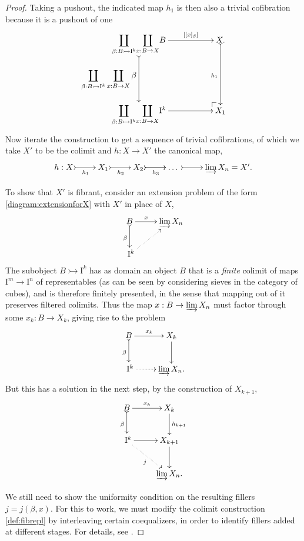 \documentclass[11pt]{article}
\makeatletter
\newcommand{\pocorner}[1][dr]{\save*!/#1+1.2pc/#1:(1,-1)@^{|-}\restore}
\newcommand{\mono}{\ensuremath{\rightarrowtail}}
\newcommand{\ra}{\ensuremath{\rightarrow}}
\newcommand{\I}{\ensuremath{\mathrm{I}}}
\theoremstyle{remark}
\theoremstyle{definition}
\makeatother
\begin{document}
\begin{proof}
Taking a pushout, the indicated map $h_1$ is then also a trivial cofibration because it is a pushout of one
\begin{equation*}%
\xymatrix{
{\displaystyle\coprod_{\beta: B\mono\I^k}} {{\displaystyle\coprod_{x: B\ra X}} B} {\ar@{>->}[dd]_-{{\displaystyle\coprod_{\beta: B\mono\I^k}} \displaystyle\coprod_{x: B\ra X}\beta}} {\ar[rr]^-{[[x]_\beta]}} && X \ar@{>->}[dd]_{h_1}.\\
&&\\
{\displaystyle\coprod_{\beta: B\mono\I^k}} {{\displaystyle\coprod_{x: B\ra X}} \I^{k}}{\ar[rr]} && {\pocorner} X_1
}
\end{equation*}
Now iterate the construction to get a sequence of trivial cofibrations, of which we take $X'$ to be the colimit and $h :X\to X'$ the canonical map,
\begin{equation}\label{def:fibrepl}
\xymatrix{
h:X \ar@{>->}[r]_-{h_1} & X_1 \ar@{>->}[r]_-{h_2} & X_2 \ar@{>->}[r]_-{h_3} \ar@{>->}[r] & \dots\ \ar@{>->}[r] & {\varinjlim X_n} = X'.
}
\end{equation}

To show that $X'$ is fibrant, consider an extension problem of the form \eqref{diagram:extensionforX} with $X'$ in place of $X$,
\begin{equation*}%
\xymatrix{
B \ar@{>->}[d]_{\beta} \ar[r]^-x & {\varinjlim X_n}\\
\ \I^{k} \ar@{..>}[ru]&
}
\end{equation*}
The subobject $B\mono \I^k$ has as domain an object $B$ that is a \emph{finite} colimit of maps $\I^m \ra \I^n$ of representables (as can be seen by considering sieves in the category of cubes), and is therefore finitely presented, in the sense that mapping out of it preserves filtered colimits.  Thus the map $x: B \to {\varinjlim X_n}$ must factor through some $x_k: B \to X_k$, giving rise to the problem
\begin{equation*}%
\xymatrix{
B \ar@{>->}[d]_{\beta} \ar[r]^-{x_k}  & X_k \ar[d] \\
\ \I^{k} \ar@{..>}[r] &  {\varinjlim X_n}.
}
\end{equation*}
But this has a solution in the next step, by the construction of $X_{k+1}$,
\begin{equation*}%
\xymatrix{
B \ar@{>->}[d]_{\beta} \ar[r]^-{x_k} & X_k \ar[d]^{h_{k+1}} \\
\ \I^{k} \ar[r]  \ar@{..>}[rd]_j &  X_{k+1}\ar[d]\\
& {\varinjlim X_n}.
}
\end{equation*}

We still need to show the uniformity condition on the resulting fillers $j = j(\beta,x)$.  For this to work, we must modify the colimit construction \eqref{def:fibrepl} by interleaving certain coequalizers, in order to identify fillers added at different stages.  For details, see \cite{Garner, Awodey}.
\end{proof}
\end{document}
